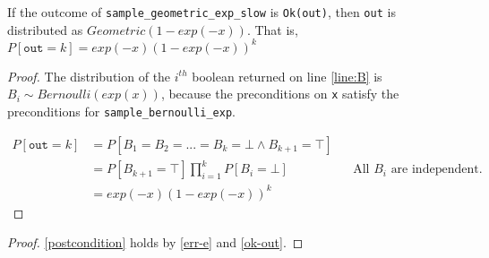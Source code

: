 \documentclass{article}
\begin{document}
\begin{theorem} \label{ok-out} \cite{CKS20} 
    If the outcome of \texttt{sample\_geometric\_exp\_slow} is \texttt{Ok(out)},  
    then \texttt{out} is distributed as $Geometric(1 - exp(-x))$. That is, $P[\texttt{out} = k] = exp(-x) (1 - exp(-x))^{k}$  
\end{theorem} 
 
\begin{proof} 
    The distribution of the $i^{th}$ boolean returned on line \ref{line:B} is $B_i \sim Bernoulli(exp(x))$, 
    because the preconditions on \texttt{x} satisfy the preconditions for \texttt{sample\_bernoulli\_exp}. 
     
    \begin{align*} 
        P[\texttt{out} = k] &= P[B_1 = B_2 = ... = B_k = \bot \land B_{k + 1} = \top] \\ 
        &= P[B_{k + 1} = \top] \prod_{i=1}^{k} P[B_i = \bot] && \text{All $B_i$ are independent.} \\ 
        &= exp(-x) (1 - exp(-x))^{k} 
    \end{align*} 
\end{proof} 
 
\begin{proof} 
    \ref{postcondition} holds by \ref{err-e} and \ref{ok-out}. 
\end{proof} 
 
 
 
 
\end{document}
